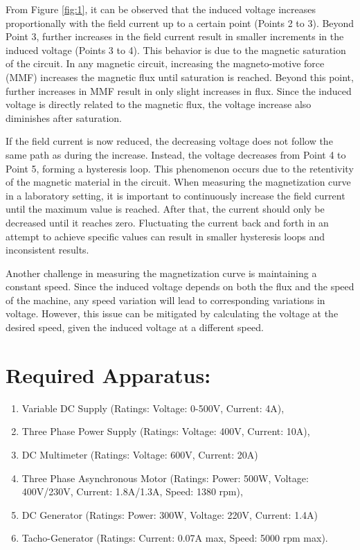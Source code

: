 \documentclass[a4paper,12pt]{article}
\begin{document}
	From Figure \ref{fig:1}, it can be observed that the induced voltage increases proportionally with the field current up to a certain point (Points 2 to 3). Beyond Point 3, further increases in the field current result in smaller increments in the induced voltage (Points 3 to 4). This behavior is due to the magnetic saturation of the circuit. In any magnetic circuit, increasing the magneto-motive force (MMF) increases the magnetic flux until saturation is reached. Beyond this point, further increases in MMF result in only slight increases in flux. Since the induced voltage is directly related to the magnetic flux, the voltage increase also diminishes after saturation.
	
	If the field current is now reduced, the decreasing voltage does not follow the same path as during the increase. Instead, the voltage decreases from Point 4 to Point 5, forming a hysteresis loop. This phenomenon occurs due to the retentivity of the magnetic material in the circuit. When measuring the magnetization curve in a laboratory setting, it is important to continuously increase the field current until the maximum value is reached. After that, the current should only be decreased until it reaches zero. Fluctuating the current back and forth in an attempt to achieve specific values can result in smaller hysteresis loops and inconsistent results.
	
	Another challenge in measuring the magnetization curve is maintaining a constant speed. Since the induced voltage depends on both the flux and the speed of the machine, any speed variation will lead to corresponding variations in voltage. However, this issue can be mitigated by calculating the voltage at the desired speed, given the induced voltage at a different speed.
	\section{Required Apparatus:}
	\begin{enumerate}
	\item Variable DC Supply (Ratings: Voltage: 0-500V, Current: 4A),	
	\item Three Phase Power Supply (Ratings: Voltage: 400V, Current: 10A),	
	\item DC Multimeter (Ratings: Voltage: 600V, Current: 20A) 
	\item Three Phase Asynchronous Motor (Ratings: Power: 500W, Voltage: 400V/230V, Current: 1.8A/1.3A, Speed: 1380 rpm),
	\item DC Generator (Ratings: Power: 300W, Voltage: 220V, Current: 1.4A)
	\item Tacho-Generator (Ratings: Current: 0.07A max, Speed: 5000 rpm max).
	\end{enumerate}
\end{document}
